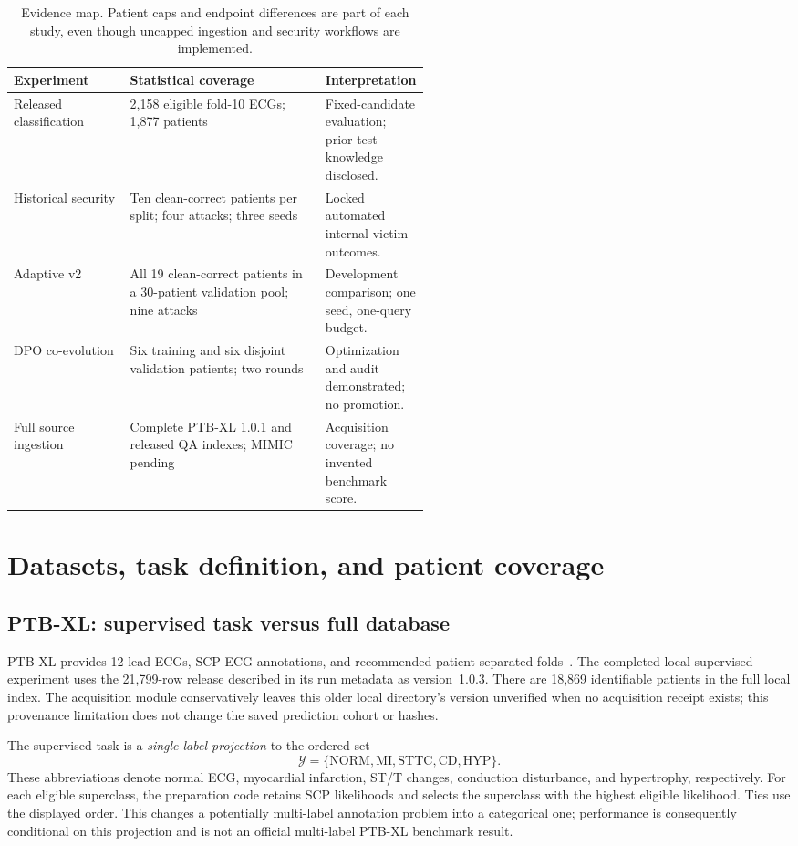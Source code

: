 \documentclass[11pt,a4paper]{article}
\begin{document}
\begin{table}[htbp]\centering\small
\begin{tabularx}{\linewidth}{p{0.28\linewidth}Xp{0.25\linewidth}}
\toprule Experiment & Statistical coverage & Interpretation \\\midrule
Released classification & 2,158 eligible fold-10 ECGs; 1,877 patients & Fixed-candidate evaluation; prior test knowledge disclosed.\\
Historical security & Ten clean-correct patients per split; four attacks; three seeds & Locked automated internal-victim outcomes.\\
Adaptive v2 & All 19 clean-correct patients in a 30-patient validation pool; nine attacks & Development comparison; one seed, one-query budget.\\
DPO co-evolution & Six training and six disjoint validation patients; two rounds & Optimization and audit demonstrated; no promotion.\\
Full source ingestion & Complete PTB-XL 1.0.1 and released QA indexes; MIMIC pending & Acquisition coverage; no invented benchmark score.\\\bottomrule
\end{tabularx}
\caption{Evidence map. Patient caps and endpoint differences are part of each study, even though uncapped ingestion and security workflows are implemented.}
\label{tab:evidencemap}\end{table}

\section{Datasets, task definition, and patient coverage}
\label{sec:data}
\subsection{PTB-XL: supervised task versus full database}
PTB-XL provides 12-lead ECGs, SCP-ECG annotations, and recommended patient-separated folds~\cite{ptbxl,ptbxl_data}. The completed local supervised experiment uses the 21,799-row release described in its run metadata as version~1.0.3. There are 18,869 identifiable patients in the full local index. The acquisition module conservatively leaves this older local directory's version unverified when no acquisition receipt exists; this provenance limitation does not change the saved prediction cohort or hashes.

The supervised task is a \emph{single-label projection} to the ordered set
\begin{equation}
\mathcal{Y}=\{\mathrm{NORM},\mathrm{MI},\mathrm{STTC},\mathrm{CD},\mathrm{HYP}\}.
\end{equation}
These abbreviations denote normal ECG, myocardial infarction, ST/T changes, conduction disturbance, and hypertrophy, respectively. For each eligible superclass, the preparation code retains SCP likelihoods and selects the superclass with the highest eligible likelihood. Ties use the displayed order. This changes a potentially multi-label annotation problem into a categorical one; performance is consequently conditional on this projection and is not an official multi-label PTB-XL benchmark result.
\end{document}
